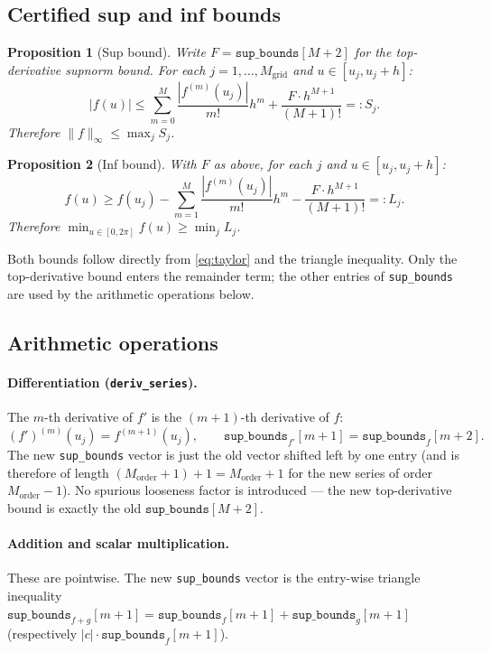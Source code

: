 \documentclass[11pt]{article}
\newtheorem{proposition}{Proposition}
\theoremstyle{definition}
\begin{document}
\subsection{Certified sup and inf bounds}

\begin{proposition}[Sup bound]\label{prop:sup}
Write $F = \texttt{sup\_bounds}[M{+}2]$ for the top-derivative supnorm bound.
For each $j = 1,\ldots,M_{\mathrm{grid}}$ and $u \in [u_j, u_j + h]$:
\[
  |f(u)| \le \sum_{m=0}^{M} \frac{|f^{(m)}(u_j)|}{m!} h^m
              + \frac{F \cdot h^{M+1}}{(M+1)!} =: S_j.
\]
Therefore $\|f\|_\infty \le \max_j S_j$.
\end{proposition}

\begin{proposition}[Inf bound]\label{prop:inf}
With $F$ as above, for each $j$ and $u \in [u_j, u_j + h]$:
\[
  f(u) \ge f(u_j) - \sum_{m=1}^{M} \frac{|f^{(m)}(u_j)|}{m!} h^m
           - \frac{F \cdot h^{M+1}}{(M+1)!} =: L_j.
\]
Therefore $\min_{u \in [0,2\pi]} f(u) \ge \min_j L_j$.
\end{proposition}

Both bounds follow directly from \eqref{eq:taylor} and the triangle inequality.
Only the top-derivative bound enters the remainder term; the other entries
of \texttt{sup\_bounds} are used by the arithmetic operations below.

\subsection{Arithmetic operations}

\paragraph{Differentiation (\texttt{deriv\_series}).}
The $m$-th derivative of $f'$ is the $(m+1)$-th derivative of $f$:
\[
  (f')^{(m)}(u_j) = f^{(m+1)}(u_j),
  \qquad
  \texttt{sup\_bounds}_{f'}[m+1] = \texttt{sup\_bounds}_{f}[m+2].
\]
The new \texttt{sup\_bounds} vector is just the old vector shifted left by
one entry (and is therefore of length $(M_{\mathrm{order}}{+}1){+}1 = M_{\mathrm{order}}{+}1$
for the new series of order $M_{\mathrm{order}}{-}1$). No spurious looseness factor
is introduced — the new top-derivative bound is exactly the old
$\texttt{sup\_bounds}[M{+}2]$.

\paragraph{Addition and scalar multiplication.}
These are pointwise. The new \texttt{sup\_bounds} vector is the entry-wise
triangle inequality $\texttt{sup\_bounds}_{f+g}[m+1] = \texttt{sup\_bounds}_f[m+1] + \texttt{sup\_bounds}_g[m+1]$
(respectively $|c| \cdot \texttt{sup\_bounds}_f[m+1]$).
\end{document}
